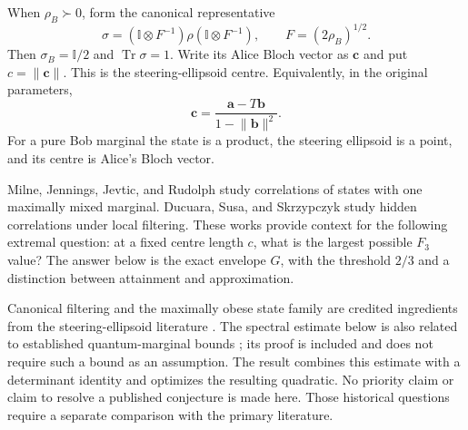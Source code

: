 \documentclass[11pt]{article}
\newcommand{\tr}{\operatorname{Tr}}
\newcommand{\Id}{\mathbb{I}}
\newcommand{\norm}[1]{\lVert #1\rVert}
\begin{document}
When $\rho_B\succ0$, form the canonical representative
\begin{equation}\label{eq:canonical}
 \sigma=(\Id\otimes F^{-1})\rho(\Id\otimes F^{-1}),
 \qquad F=(2\rho_B)^{1/2}.
\end{equation}
Then $\sigma_B=\Id/2$ and $\tr\sigma=1$. Write its Alice Bloch vector as $\mathbf c$ and put $c=\norm{\mathbf c}$. This is the steering-ellipsoid centre. Equivalently, in the original parameters,
\[
 \mathbf c=\frac{\mathbf a-T\mathbf b}{1-\norm{\mathbf b}^{2}}.
\]
For a pure Bob marginal the state is a product, the steering ellipsoid is a point, and its centre is Alice's Bloch vector.

Milne, Jennings, Jevtic, and Rudolph \cite{Milne} study correlations of states with one maximally mixed marginal. Ducuara, Susa, and Skrzypczyk \cite{Ducuara} study hidden correlations under local filtering. These works provide context for the following extremal question: at a fixed centre length $c$, what is the largest possible $F_3$ value? The answer below is the exact envelope $G$, with the threshold $2/3$ and a distinction between attainment and approximation.

Canonical filtering and the maximally obese state family are credited ingredients from the steering-ellipsoid literature \cite{Milne}. The spectral estimate below is also related to established quantum-marginal bounds \cite{Bravyi}; its proof is included and does not require such a bound as an assumption. The result combines this estimate with a determinant identity and optimizes the resulting quadratic. No priority claim or claim to resolve a published conjecture is made here. Those historical questions require a separate comparison with the primary literature.
\end{document}
